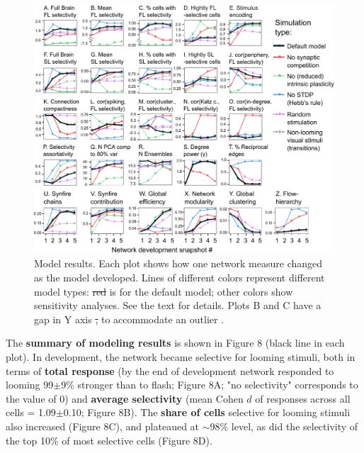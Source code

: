 \documentclass{article}
\providecommand{\DIFaddtex}[1]{{\protect\color{blue}{#1}}} %
\providecommand{\DIFdeltex}[1]{{\protect\color{red}\sout{#1}}}                      %
\providecommand{\DIFaddbegin}{} %
\providecommand{\DIFaddend}{} %
\providecommand{\DIFaddFL}[1]{\DIFadd{#1}} %
\providecommand{\DIFdelFL}[1]{\DIFdel{#1}} %
\providecommand{\DIFaddbeginFL}{} %
\providecommand{\DIFaddendFL}{} %
\providecommand{\DIFdelbeginFL}{} %
\providecommand{\DIFdelendFL}{} %
\providecommand{\DIFadd}[1]{\texorpdfstring{\DIFaddtex{#1}}{#1}} %
\providecommand{\DIFdel}[1]{\texorpdfstring{\DIFdeltex{#1}}{}} %
\newcommand{\DIFscaledelfig}{0.5}
\newlength{\DIFdelgraphicswidth} %
\newlength{\DIFdelgraphicsheight} %
\newcommand{\DIFaddincludegraphics}[2][]{{\color{blue}\fbox{\DIFOincludegraphics[#1]{#2}}}} %
\newcommand{\DIFdelincludegraphics}[2][]{%
\sbox{\DIFdelgraphicsbox}{\DIFOincludegraphics[#1]{#2}}%
\settoboxwidth{\DIFdelgraphicswidth}{\DIFdelgraphicsbox} %
\settoboxtotalheight{\DIFdelgraphicsheight}{\DIFdelgraphicsbox} %
\scalebox{\DIFscaledelfig}{%
\parbox[b]{\DIFdelgraphicswidth}{\usebox{\DIFdelgraphicsbox}\\[-\baselineskip] \rule{\DIFdelgraphicswidth}{0em}}\llap{\resizebox{\DIFdelgraphicswidth}{\DIFdelgraphicsheight}{%
\setlength{\unitlength}{\DIFdelgraphicswidth}%
\begin{picture}(1,1)%
\thicklines\linethickness{2pt} %
{\color[rgb]{1,0,0}\put(0,0){\framebox(1,1){}}}%
{\color[rgb]{1,0,0}\put(0,0){\line( 1,1){1}}}%
{\color[rgb]{1,0,0}\put(0,1){\line(1,-1){1}}}%
\end{picture}%
}\hspace*{3pt}}} %
} %
\DeclareRobustCommand{\DIFaddbegin}{\DIFOaddbegin \let\includegraphics\DIFaddincludegraphics} %
\DeclareRobustCommand{\DIFaddend}{\DIFOaddend \let\includegraphics\DIFOincludegraphics} %
\DeclareRobustCommand{\DIFaddbeginFL}{\DIFOaddbeginFL \let\includegraphics\DIFaddincludegraphics} %
\DeclareRobustCommand{\DIFaddendFL}{\DIFOaddendFL \let\includegraphics\DIFOincludegraphics} %
\DeclareRobustCommand{\DIFdelbeginFL}{\DIFOdelbeginFL \let\includegraphics\DIFdelincludegraphics} %
\DeclareRobustCommand{\DIFdelendFL}{\DIFOaddendFL \let\includegraphics\DIFOincludegraphics} %
\begin{document}
\begin{figure}[t!]
\includegraphics[width=\linewidth]{fig8.pdf}
\caption{
Model results. Each plot shows how one network measure changed as the model developed. Lines of different colors represent different model types: \DIFdelbeginFL \DIFdelFL{red }\DIFdelendFL \DIFaddbeginFL \DIFaddFL{bold black }\DIFaddendFL is for the default model; other colors show sensitivity analyses. See the text for details. Plots B and C have a gap in Y axis \DIFdelbeginFL \DIFdelFL{, }\DIFdelendFL to accommodate an outlier \DIFaddbeginFL \DIFaddFL{curve}\DIFaddendFL . }
\end{figure}

The \textbf{summary of modeling results} is shown in Figure 8 (black line in each plot). In development, the network became selective for looming stimuli, both in terms of \textbf{total response} (by the end of development network responded to looming 99$\pm$9\% \DIFaddbegin \DIFadd{(about 2 times) }\DIFaddend stronger than to flash; Figure 8A; "no selectivity" corresponds to the value of 0) and \textbf{average selectivity} (mean Cohen $d$ of responses across all cells = 1.09$\pm$0.10; Figure 8B). The \textbf{share of cells} selective for looming stimuli also increased (Figure 8C), and plateaued at $\sim$98\% level, as did the selectivity of the top 10\% of most selective cells (Figure 8D).
\end{document}
